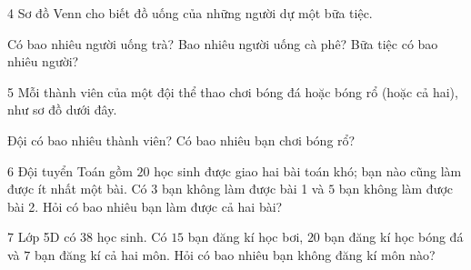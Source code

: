 \gap
\needspace{7.5cm}
\begin{probbox}{4}{\relax}
Sơ đồ Venn cho biết đồ uống của những người dự một bữa tiệc.
\begin{center}
\end{center}
 Có bao nhiêu người uống trà? \quad {} Bao nhiêu người uống cà phê? \quad {} Bữa tiệc có bao nhiêu người?
\end{probbox}
\gap
\needspace{7.5cm}
\begin{probbox}{5}{\relax}
Mỗi thành viên của một đội thể thao chơi bóng đá hoặc bóng rổ (hoặc cả hai), như sơ đồ dưới đây.
\begin{center}
\end{center}
 Đội có bao nhiêu thành viên? \quad {} Có bao nhiêu bạn chơi bóng rổ?
\end{probbox}
\gap
\begin{probbox}{6}{\relax}
Đội tuyển Toán gồm $20$ học sinh được giao hai bài toán khó; bạn nào cũng làm được ít nhất một bài. Có $3$ bạn không làm được bài 1 và $5$ bạn không làm được bài 2. Hỏi có bao nhiêu bạn làm được cả hai bài?
\end{probbox}
\gap
\begin{probbox}{7}{\relax}
Lớp 5D có $38$ học sinh. Có $15$ bạn đăng kí học bơi, $20$ bạn đăng kí học bóng đá và $7$ bạn đăng kí cả hai môn. Hỏi có bao nhiêu bạn không đăng kí môn nào?
\end{probbox}
